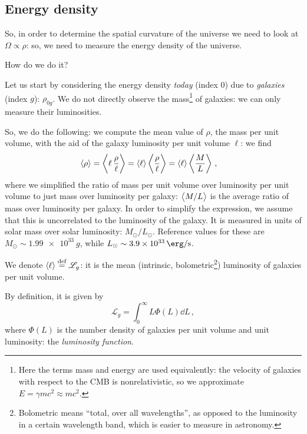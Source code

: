 \documentclass[main.tex]{subfiles}
\begin{document}
\subsection{Energy density}

So, in order to determine the spatial curvature of the universe we need to look at \(\Omega \propto \rho \): so, we need to measure the energy density of the universe.

How do we do it?

Let us start by considering the energy density \emph{today} (index 0) due to \emph{galaxies} (index \(g\)): \(\rho_{0g}\).
We do not directly observe the mass\footnote{Here the terms mass and energy are used equivalently: the velocity of galaxies with respect to the CMB is nonrelativistic, so we approximate \(E = \gamma m c^2 \approx m c^2\).}  
of galaxies: we can only measure their luminosities.

So, we do the following: we compute the mean value of \(\rho \), the mass per unit volume, with the aid of the galaxy luminosity per unit volume \(\ell\): we find 
%
\begin{align}
\expval{\rho }
&= \expval{\ell \,\frac{\rho }{\ell}} 
= \expval{\ell} \expval{\frac{\rho }{\ell}} 
= \expval{\ell} \expval{\frac{M}{L}}
\,,
\end{align}
%
where we simplified the ratio of mass per unit volume over luminosity per unit volume to just mass over luminosity per galaxy: \(\expval{M / L}\) is the average ratio of mass over luminosity per galaxy.
In order to simplify the expression, we assume that this is uncorrelated to the luminosity of the galaxy.
It is measured in units of solar mass over solar luminosity: \(M_{\odot} / L_{\odot}\).
Reference values for these are \(M_{\odot} \sim \SI{1.99e33}{g}\), while \(L_\odot \sim \SI{3.9e33}{\erg\per\second} \).

We denote \( \expval{\ell} \stackrel{\text{def}}{=} \mathscr L_g  \): it is the mean (intrinsic, bolometric\footnote{Bolometric means ``total, over all wavelengths'', as opposed to the luminosity in a certain wavelength band, which is easier to measure in astronomy.}) luminosity of galaxies per unit volume.

By definition, it is given by 
%
\begin{equation}
  \mathscr L _g = \int_0^\infty  L \Phi(L) \dd{L}
\,,
\end{equation}
%
where \(\Phi(L)\) is the number density of galaxies per unit volume and unit luminosity: the \emph{luminosity function}.
\end{document}
